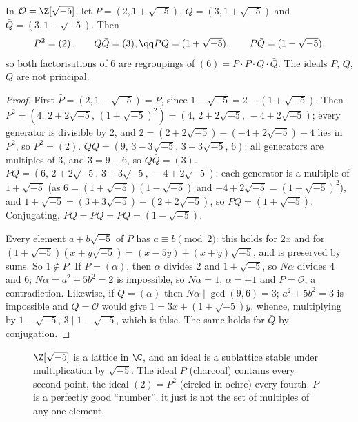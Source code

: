 \begin{proposition}\label{prop:six}
In $\mathcal O=\Z[\sqrt{-5}]$, let $P=(2,1+\sqrt{-5})$, $Q=(3,1+\sqrt{-5})$ and $\bar Q=(3,1-\sqrt{-5})$. Then
\[
\begin{gathered}P^2=(2),\qquad Q\bar Q=(3),\qq PQ=(1+\sqrt{-5}),\qquad P\bar Q=(1-\sqrt{-5}),\end{gathered}
\]
so both factorisations of $6$ are regroupings of $(6)=P\cdot P\cdot Q\cdot\bar Q$. The ideals $P$, $Q$, $\bar Q$ are not principal.
\end{proposition}
\begin{proof}
First $\bar P=(2,1-\sqrt{-5})=P$, since $1-\sqrt{-5}=2-(1+\sqrt{-5})$. Then
$P^2=(4,\,2+2\sqrt{-5},\,(1+\sqrt{-5})^2)=(4,\,2+2\sqrt{-5},\,-4+2\sqrt{-5})$; every generator is divisible by $2$, and $2=(2+2\sqrt{-5})-(-4+2\sqrt{-5})-4$ lies in $P^2$, so $P^2=(2)$.
$Q\bar Q=(9,\,3-3\sqrt{-5},\,3+3\sqrt{-5},\,6)$: all generators are multiples of $3$, and $3=9-6$, so $Q\bar Q=(3)$.
$PQ=(6,\,2+2\sqrt{-5},\,3+3\sqrt{-5},\,-4+2\sqrt{-5})$: each generator is a multiple of $1+\sqrt{-5}$ (as $6=(1+\sqrt{-5})(1-\sqrt{-5})$ and $-4+2\sqrt{-5}=(1+\sqrt{-5})^2$), and $1+\sqrt{-5}=(3+3\sqrt{-5})-(2+2\sqrt{-5})$, so $PQ=(1+\sqrt{-5})$. Conjugating, $P\bar Q=\bar P\bar Q=\overline{PQ}=(1-\sqrt{-5})$.

Every element $a+b\sqrt{-5}$ of $P$ has $a\equiv b\pmod2$: this holds for $2x$ and for $(1+\sqrt{-5})(x+y\sqrt{-5})=(x-5y)+(x+y)\sqrt{-5}$, and is preserved by sums. So $1\notin P$. If $P=(\alpha)$, then $\alpha$ divides $2$ and $1+\sqrt{-5}$, so $N\alpha$ divides $4$ and $6$; $N\alpha=a^2+5b^2=2$ is impossible, so $N\alpha=1$, $\alpha=\pm1$ and $P=\mathcal O$, a contradiction. Likewise, if $Q=(\alpha)$ then $N\alpha\mid\gcd(9,6)=3$; $a^2+5b^2=3$ is impossible and $Q=\mathcal O$ would give $1=3x+(1+\sqrt{-5})y$, whence, multiplying by $1-\sqrt{-5}$, $3\mid1-\sqrt{-5}$, which is false. The same holds for $\bar Q$ by conjugation.
\end{proof}

\begin{figure}[ht]
\centering
{}
\caption{$\Z[\sqrt{-5}]$ is a lattice in $\C$, and an ideal is a sublattice stable under multiplication by $\sqrt{-5}$. The ideal $P$ (charcoal) contains every second point, the ideal $(2)=P^2$ (circled in ochre) every fourth. $P$ is a perfectly good ``number'', it just is not the set of multiples of any one element.}
\label{fig:lattice}
\end{figure}

